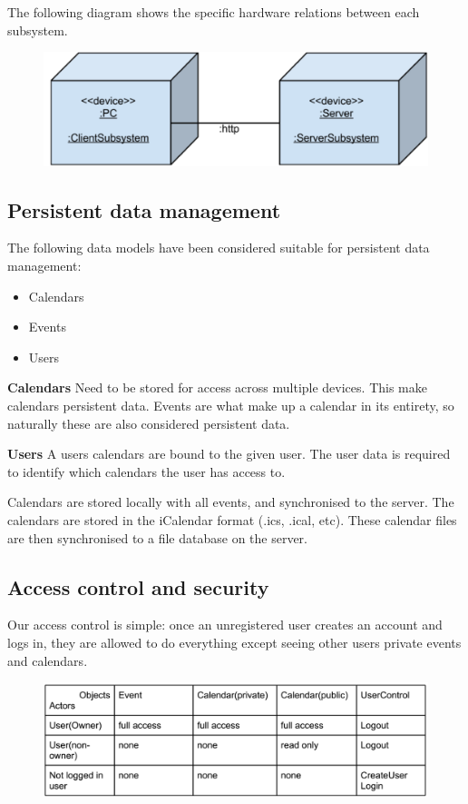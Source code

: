 \documentclass[10pt]{report}
\numberwithin{equation}{section} %
\numberwithin{figure}{section} %
\numberwithin{table}{section} %
\begin{document}
The following diagram shows the specific hardware relations between each
subsystem.
\begin{figure}[H]
  \includegraphics[scale=0.7]{figures/components.png}
\end{figure}

\subsection{Persistent data management}
The following data models have been considered suitable for persistent data
management:
\begin{itemize}
\item Calendars
\item Events
\item Users
\end{itemize}

\textbf{Calendars}  Need to be stored for access across multiple devices. This make
calendars persistent data. Events are what make up a calendar in its entirety,
so naturally these are also considered persistent data.


\textbf{Users} A users calendars are bound to the given user. The user data is required
to identify which calendars the user has access to.


Calendars are stored locally with all events, and synchronised to the
server. The calendars are stored in the iCalendar format (.ics, .ical,
etc). These calendar files are then synchronised to a file database on the
server.

\subsection{Access control and security}
Our access control is simple: once an unregistered user creates an account and
logs in, they are allowed to do everything except seeing other users private
events and calendars.

\begin{figure}[H]
  \includegraphics[scale=0.7]{figures/accesscontrol.png}
\end{figure}
\end{document}

